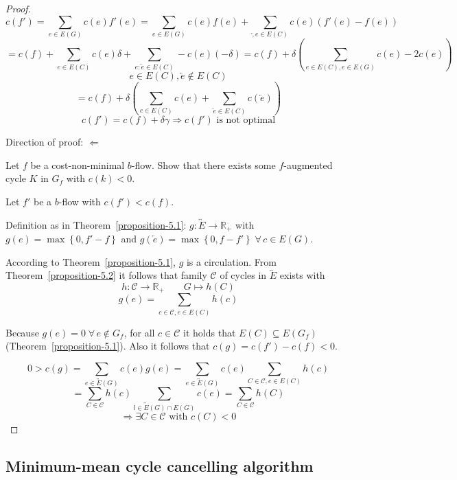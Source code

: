 \documentclass{article}
\newcommand{\set}[1]{\left\{#1\right\}}
\newcommand{\fall}{\;\forall\,}
\begin{document}
\begin{proof}
  \[
    c(f') = \sum_{e \in E(G)} c(e) f'(e) = \sum_{e \in E(G)} c(e) f(e) + \sum_{\overleftarrow, e \in E(C)} c(e)(f'(e) - f(e))
  \] \[
    = c(f) + \sum_{e \in E(C)} c(e) \delta + \sum_{e: \overleftarrow{e} \in E(C)} -c(e)(-\delta)
    = c(f) + \delta\left(\sum_{e \in E(C), e \in E(G)} c(e) - 2c(e)\right)
  \] \[
    e \in E(C), \overleftarrow{e} \notin E(C)
  \] \[
    = c(f) + \delta\left(\sum_{c \in E(C)} c(e) + \sum_{\overleftarrow{e} \in E(C)} c(\overleftarrow{e}) \right)
  \] \[
    c(f') = c(f) + \delta\gamma \Rightarrow c(f') \text{ is not optimal}
  \]

  Direction of proof: $\Leftarrow$

  Let $f$ be a cost-non-minimal $b$-flow. Show that there exists some $f$-augmented cycle $K$ in $G_f$ with $c(k) < 0$.

  Let $f'$ be a $b$-flow with $c(f') < c(f)$.

  Definition as in Theorem~\ref{proposition-5.1}: $g: \overleftrightarrow{E} \rightarrow \mathbb{R}_+$ with $g(e) = \max\set{0, f' - f}$ and $g(\overleftarrow{e}) = \max\set{0, f - f'} \fall c \in E(G)$.

  According to Theorem~\ref{proposition-5.1}, $g$ is a circulation. From Theorem~\ref{proposition-5.2} it follows that family $\mathcal{C}$ of cycles in $\overleftrightarrow{E}$ exists with
  \[
    h: \mathcal{C} \rightarrow \mathbb{R}_+  \qquad G \mapsto h(C)
  \] \[
    g(e) = \sum_{c \in \mathcal{C}, e \in E(C)} h(c)
  \]

  Because $g(e) = 0 \fall e \notin G_f$, for all $c \in \mathcal{C}$ it holds that $E(C) \subseteq E(G_f)$ (Theorem~\ref{proposition-5.1}). Also it follows that $c(g) = c(f') - c(f) < 0$.

  \[
    0 > c(g)
      = \sum_{e \in \overleftrightarrow{E}(G)} c(e) g(e)
      = \sum_{e \in \overleftrightarrow{E}(G)} c(e) \sum_{C \in \mathcal{C}, e \in E(C)} h(c)
  \] \[
      = \sum_{C \in \mathcal{C}} h(c) \sum_{l \in \overleftrightarrow{E}(G) \cap E(G)} c(e)
      = \sum_{C \in \mathcal{C}} h(C)
  \] \[
    \Rightarrow \exists C \in \mathcal{C} \text{ with } c(C) < 0
  \]
\end{proof}

\subsection{Minimum-mean cycle cancelling algorithm}
\end{document}
